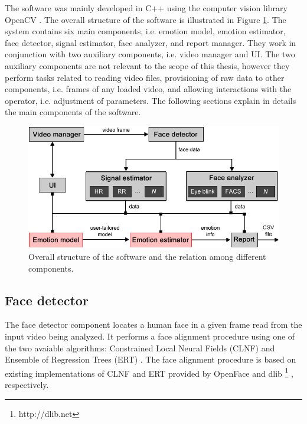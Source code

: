 The software was mainly developed in C++ using the computer vision library OpenCV \parencite{opencv_library}. The overall structure of the software is illustrated in Figure \ref{fig:tool-overall-structure}. The system contains six main components, i.e. emotion model, emotion estimator, face detector, signal estimator, face analyzer, and report manager. They work in conjunction with two auxiliary components, i.e. video manager and UI. The two auxiliary components are not relevant to the scope of this thesis, however they perform tasks related to reading video files, provisioning of raw data to other components, i.e. frames of any loaded video, and allowing interactions with the operator, i.e. adjustment of parameters. The following sections explain in details the main components of the software.

\begin{figure}
    \centering
    \includegraphics[width=\textwidth]{Content/figures/tool-overall-structure.png}
    \caption{Overall structure of the software and the relation among different components.}
    \label{fig:tool-overall-structure}
\end{figure}

\subsection{Face detector}

The face detector component locates a human face in a given frame read from the input video being analyzed. It performs a face alignment procedure using one of the two avaiable algorithms: Constrained Local Neural Fields (CLNF) \parencite{baltrusaitis2013constrained} and Ensemble of Regression Trees (ERT) \parencite{kazemi2014one}. The face alignment procedure is based on existing implementations of CLNF and ERT provided by OpenFace \parencite{baltruvsaitis2016openface} and dlib \footnote{http://dlib.​net} \parencite{dlib09}, respectively.

